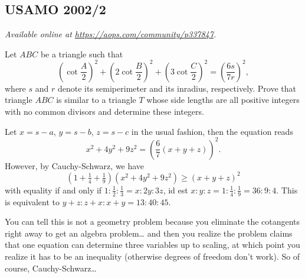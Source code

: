 \documentclass[11pt]{scrartcl}
\begin{document}
\subsection{USAMO 2002/2}
\textsl{Available online at \url{https://aops.com/community/p337847}.}
\begin{mdframed}[style=mdpurplebox,frametitle={Problem statement}]
Let $ABC$ be a triangle such that
\[
  \left( \cot \frac{A}{2} \right)^2
  + \left( 2\cot \frac{B}{2} \right)^2
  + \left( 3\cot \frac{C}{2} \right)^2
  = \left( \frac{6s}{7r} \right)^2,
\]
where $s$ and $r$ denote its semiperimeter and its inradius, respectively.
Prove that triangle $ABC$ is similar to a triangle $T$ whose
side lengths are all positive integers
with no common divisors and determine these integers.
\end{mdframed}
Let $x = s-a$, $y = s-b$, $z = s-c$ in the usual fashion, then the equation reads
\[ x^2 + 4y^2 + 9z^2 = \left( \frac67(x+y+z) \right)^2. \]
However, by Cauchy-Schwarz, we have
\[ \left( 1 + \tfrac14 + \tfrac19 \right)\left( x^2 + 4y^2 + 9z^2 \right) \ge \left( x+y+z \right)^2  \]
with equality if and only if $1 : \tfrac12 : \tfrac13 = x : 2y : 3z$,
id est $x : y : z = 1 : \tfrac14 : \tfrac19 = 36 : 9 : 4$.
This is equivalent to $y+z : z+x : x+y = 13 : 40 : 45$.


\begin{remark*}
You can tell this is not a geometry problem
because you eliminate the cotangents right away to get an algebra problem\dots
and then you realize the problem claims that one equation
can determine three variables up to scaling,
at which point you realize it has to be an inequality
(otherwise degrees of freedom don't work).
So of course, Cauchy-Schwarz\dots
\end{remark*}
\pagebreak
\end{document}
